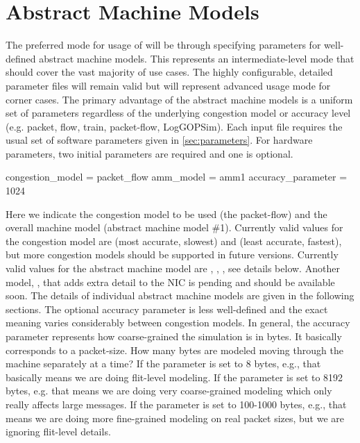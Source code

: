 
\section{Abstract Machine Models}
\label{sec:amm}

The preferred mode for usage of \sstmacro will be through specifying parameters for well-defined abstract machine models.
This represents an intermediate-level mode that should cover the vast majority of use cases.
The highly configurable, detailed parameter files will remain valid but will represent advanced usage mode for corner cases.
The primary advantage of the abstract machine models is a uniform set of parameters regardless of the underlying congestion model or accuracy level (e.g. packet, flow, train, packet-flow, LogGOPSim).
Each input file requires the usual set of software parameters given in \ref{sec:parameters}.
For hardware parameters, two initial parameters are required and one is optional.

\begin{ViFile}
congestion_model = packet_flow
amm_model = amm1
accuracy_parameter = 1024
\end{ViFile} 

Here we indicate the congestion model to be used (the packet-flow) and the overall machine model (abstract machine model \#1).
Currently valid values for the congestion model are  (most accurate, slowest) and  (least accurate, fastest),
but more congestion models should be supported in future versions.
Currently valid values for the abstract machine model are , , , see details below. 
Another model, , that adds extra detail to the NIC is pending and should be available soon.
The details of individual abstract machine models are given in the following sections.
The optional accuracy parameter is less well-defined and the exact meaning varies considerably between congestion models.
In general, the accuracy parameter represents how coarse-grained the simulation is in bytes.
It basically corresponds to a packet-size. How many bytes are modeled moving through the machine separately at a time?
If the parameter is set to 8 bytes, e.g., that basically means we are doing flit-level modeling.
If the parameter is set to 8192 bytes, e.g. that means we are doing very coarse-grained modeling which only really affects large messages.
If the parameter is set to 100-1000 bytes, e.g., that means we are doing more fine-grained modeling on real packet sizes, but we are ignoring flit-level details.

